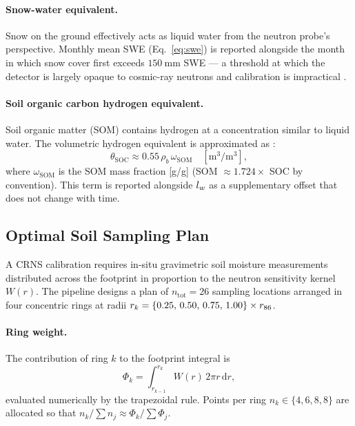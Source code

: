 \paragraph{Snow-water equivalent.}
Snow on the ground effectively acts as liquid water from the
neutron probe's perspective.
Monthly mean SWE (Eq.~\eqref{eq:swe}) is reported alongside
the month in which snow cover first exceeds
$\SI{150}{\milli\metre}$ SWE — a threshold at which the detector
is largely opaque to cosmic-ray neutrons and calibration is
impractical \citep{bogena2017}.

\paragraph{Soil organic carbon hydrogen equivalent.}
Soil organic matter (SOM) contains hydrogen at a concentration
similar to liquid water.
The volumetric hydrogen equivalent is approximated as
\citep{bogena2017}:
\begin{equation}
  \theta_\mathrm{SOC} \approx
    0.55\,\rho_b\,\omega_\mathrm{SOM}
  \quad[\si{\cubic\metre\per\cubic\metre}],
  \label{eq:thetaSOC}
\end{equation}
where $\omega_\mathrm{SOM}$ is the SOM mass fraction [g/g]
(SOM $\approx 1.724\times$ SOC by convention).
This term is reported alongside $l_w$ as a supplementary offset
that does not change with time.

\subsection{Optimal Soil Sampling Plan}
\label{sec:methods:sampling}

A CRNS calibration requires in-situ gravimetric soil moisture
measurements distributed across the footprint in proportion to
the neutron sensitivity kernel $W(r)$.
The pipeline designs a plan of $n_\mathrm{tot} = 26$ sampling
locations arranged in four concentric rings at radii
$r_k = \{0.25,\, 0.50,\, 0.75,\, 1.00\} \times r_{86}$.

\paragraph{Ring weight.}
The contribution of ring $k$ to the footprint integral is
\begin{equation}
  \Phi_k = \int_{r_{k-1}}^{r_k} W(r)\,2\pi r\,\mathrm{d}r,
  \label{eq:ring_weight}
\end{equation}
evaluated numerically by the trapezoidal rule.
Points per ring $n_k \in \{4, 6, 8, 8\}$ are allocated so that
$n_k / \sum n_j \approx \Phi_k / \sum \Phi_j$.

